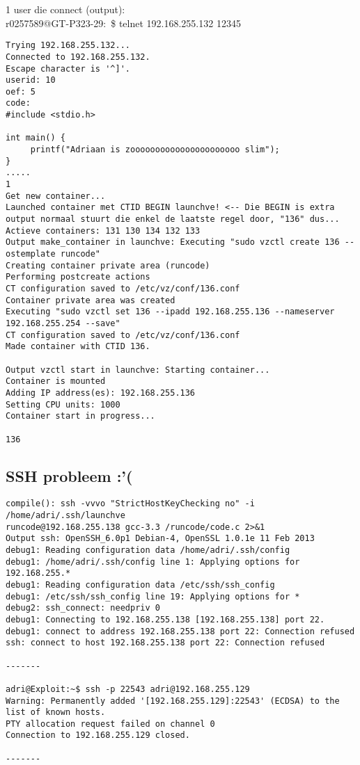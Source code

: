 1 user die connect (output):\\
r0257589@GT-P323-29:~\$ telnet 192.168.255.132 12345
\begin{lstlisting}
Trying 192.168.255.132...
Connected to 192.168.255.132.
Escape character is '^]'.
userid: 10
oef: 5
code:
#include <stdio.h>
         
int main() {
     printf("Adriaan is zoooooooooooooooooooooo slim");
}
.....
1
Get new container...
Launched container met CTID BEGIN launchve! <-- Die BEGIN is extra output normaal stuurt die enkel de laatste regel door, "136" dus...
Actieve containers: 131 130 134 132 133
Output make_container in launchve: Executing "sudo vzctl create 136 --ostemplate runcode"
Creating container private area (runcode)
Performing postcreate actions
CT configuration saved to /etc/vz/conf/136.conf
Container private area was created
Executing "sudo vzctl set 136 --ipadd 192.168.255.136 --nameserver 192.168.255.254 --save"
CT configuration saved to /etc/vz/conf/136.conf
Made container with CTID 136.
      
Output vzctl start in launchve: Starting container...
Container is mounted
Adding IP address(es): 192.168.255.136
Setting CPU units: 1000
Container start in progress...

136
\end{lstlisting}
    

\subsection{SSH probleem :'(}
\begin{lstlisting}
compile(): ssh -vvvo "StrictHostKeyChecking no" -i /home/adri/.ssh/launchve 
runcode@192.168.255.138 gcc-3.3 /runcode/code.c 2>&1
Output ssh: OpenSSH_6.0p1 Debian-4, OpenSSL 1.0.1e 11 Feb 2013
debug1: Reading configuration data /home/adri/.ssh/config
debug1: /home/adri/.ssh/config line 1: Applying options for 192.168.255.*
debug1: Reading configuration data /etc/ssh/ssh_config
debug1: /etc/ssh/ssh_config line 19: Applying options for *
debug2: ssh_connect: needpriv 0
debug1: Connecting to 192.168.255.138 [192.168.255.138] port 22.
debug1: connect to address 192.168.255.138 port 22: Connection refused
ssh: connect to host 192.168.255.138 port 22: Connection refused
      
-------
      
adri@Exploit:~$ ssh -p 22543 adri@192.168.255.129
Warning: Permanently added '[192.168.255.129]:22543' (ECDSA) to the list of known hosts.
PTY allocation request failed on channel 0
Connection to 192.168.255.129 closed.
      
-------
\end{lstlisting}